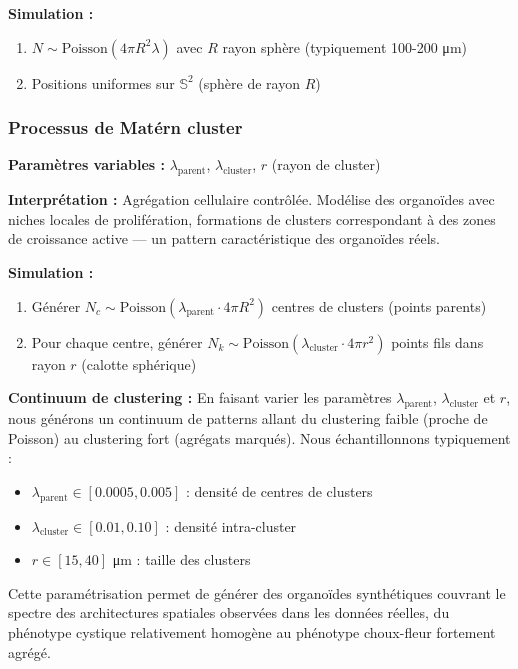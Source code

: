\textbf{Simulation :}
\begin{enumerate}
    \item $N \sim \text{Poisson}(4\pi R^2 \lambda)$ avec $R$ rayon sphère (typiquement 100-200 μm)
    \item Positions uniformes sur $\mathbb{S}^2$ (sphère de rayon $R$)
\end{enumerate}

\subsubsection{Processus de Matérn cluster}

\textbf{Paramètres variables :} $\lambda_{\text{parent}}$, $\lambda_{\text{cluster}}$, $r$ (rayon de cluster)

\textbf{Interprétation :} Agrégation cellulaire contrôlée. Modélise des organoïdes avec niches locales de prolifération, formations de clusters correspondant à des zones de croissance active — un pattern caractéristique des organoïdes réels.

\textbf{Simulation :}
\begin{enumerate}
    \item Générer $N_c \sim \text{Poisson}(\lambda_{\text{parent}} \cdot 4\pi R^2)$ centres de clusters (points parents)
    \item Pour chaque centre, générer $N_k \sim \text{Poisson}(\lambda_{\text{cluster}} \cdot 4\pi r^2)$ points fils dans rayon $r$ (calotte sphérique)
\end{enumerate}

\textbf{Continuum de clustering :}
En faisant varier les paramètres $\lambda_{\text{parent}}$, $\lambda_{\text{cluster}}$ et $r$, nous générons un continuum de patterns allant du clustering faible (proche de Poisson) au clustering fort (agrégats marqués). Nous échantillonnons typiquement :
\begin{itemize}
    \item $\lambda_{\text{parent}} \in [0.0005, 0.005]$ : densité de centres de clusters
    \item $\lambda_{\text{cluster}} \in [0.01, 0.10]$ : densité intra-cluster
    \item $r \in [15, 40]$ μm : taille des clusters
\end{itemize}

Cette paramétrisation permet de générer des organoïdes synthétiques couvrant le spectre des architectures spatiales observées dans les données réelles, du phénotype cystique relativement homogène au phénotype choux-fleur fortement agrégé.

